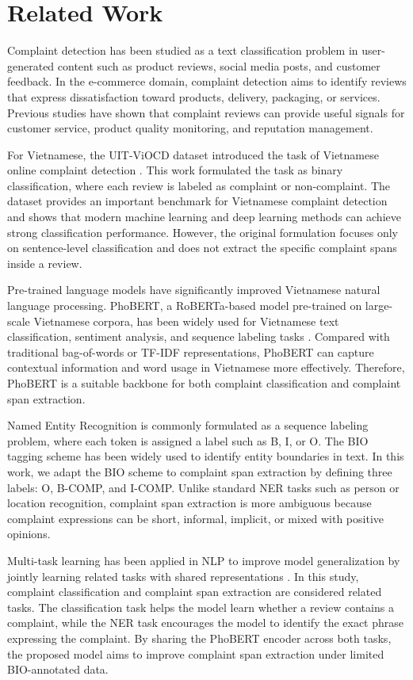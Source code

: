 \documentclass[11pt]{article}
\begin{document}
\section{Related Work}

Complaint detection has been studied as a text classification problem in user-generated content such as product reviews, social media posts, and customer feedback. In the e-commerce domain, complaint detection aims to identify reviews that express dissatisfaction toward products, delivery, packaging, or services. Previous studies have shown that complaint reviews can provide useful signals for customer service, product quality monitoring, and reputation management.

For Vietnamese, the UIT-ViOCD dataset introduced the task of Vietnamese online complaint detection \citep{viocd2021}. This work formulated the task as binary classification, where each review is labeled as complaint or non-complaint. The dataset provides an important benchmark for Vietnamese complaint detection and shows that modern machine learning and deep learning methods can achieve strong classification performance. However, the original formulation focuses only on sentence-level classification and does not extract the specific complaint spans inside a review.

Pre-trained language models have significantly improved Vietnamese natural language processing. PhoBERT, a RoBERTa-based model pre-trained on large-scale Vietnamese corpora, has been widely used for Vietnamese text classification, sentiment analysis, and sequence labeling tasks \citep{phobert2020,roberta2019}. Compared with traditional bag-of-words or TF-IDF representations, PhoBERT can capture contextual information and word usage in Vietnamese more effectively. Therefore, PhoBERT is a suitable backbone for both complaint classification and complaint span extraction.

Named Entity Recognition is commonly formulated as a sequence labeling problem, where each token is assigned a label such as B, I, or O. The BIO tagging scheme has been widely used to identify entity boundaries in text. In this work, we adapt the BIO scheme to complaint span extraction by defining three labels: O, B-COMP, and I-COMP. Unlike standard NER tasks such as person or location recognition, complaint span extraction is more ambiguous because complaint expressions can be short, informal, implicit, or mixed with positive opinions.

Multi-task learning has been applied in NLP to improve model generalization by jointly learning related tasks with shared representations \citep{caruana1997multitask}. In this study, complaint classification and complaint span extraction are considered related tasks. The classification task helps the model learn whether a review contains a complaint, while the NER task encourages the model to identify the exact phrase expressing the complaint. By sharing the PhoBERT encoder across both tasks, the proposed model aims to improve complaint span extraction under limited BIO-annotated data.
\end{document}
